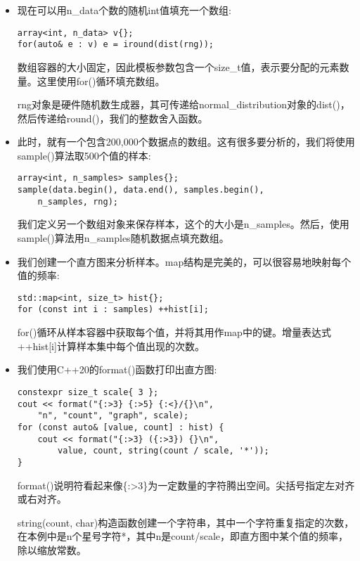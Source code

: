 \begin{itemize}
\item 
现在可以用n\_data个数的随机int值填充一个数组:

\begin{lstlisting}[style=styleCXX]
array<int, n_data> v{};
for(auto& e : v) e = iround(dist(rng));
\end{lstlisting}

数组容器的大小固定，因此模板参数包含一个size\_t值，表示要分配的元素数量。这里使用for()循环填充数组。

rng对象是硬件随机数生成器，其可传递给normal\_distribution对象的dist()，然后传递给round()，我们的整数舍入函数。

\item 
此时，就有一个包含200,000个数据点的数组。这有很多要分析的，我们将使用sample()算法取500个值的样本:

\begin{lstlisting}[style=styleCXX]
array<int, n_samples> samples{};
sample(data.begin(), data.end(), samples.begin(),
	n_samples, rng);
\end{lstlisting}

我们定义另一个数组对象来保存样本，这个的大小是n\_samples。然后，使用sample()算法用n\_samples随机数据点填充数组。

\item 
我们创建一个直方图来分析样本。map结构是完美的，可以很容易地映射每个值的频率:

\begin{lstlisting}[style=styleCXX]
std::map<int, size_t> hist{};
for (const int i : samples) ++hist[i];
\end{lstlisting}

for()循环从样本容器中获取每个值，并将其用作map中的键。增量表达式++hist[i]计算样本集中每个值出现的次数。

\item 
我们使用C++20的format()函数打印出直方图:

\begin{lstlisting}[style=styleCXX]
constexpr size_t scale{ 3 };
cout << format("{:>3} {:>5} {:<}/{}\n",
	"n", "count", "graph", scale);
for (const auto& [value, count] : hist) {
	cout << format("{:>3} ({:>3}) {}\n",
		value, count, string(count / scale, '*'));
}
\end{lstlisting}

format()说明符看起来像\{:>3\}为一定数量的字符腾出空间。尖括号指定左对齐或右对齐。

string(count, char)构造函数创建一个字符串，其中一个字符重复指定的次数，在本例中是n个星号字符*，其中n是count/scale，即直方图中某个值的频率，除以缩放常数。


\end{itemize}
